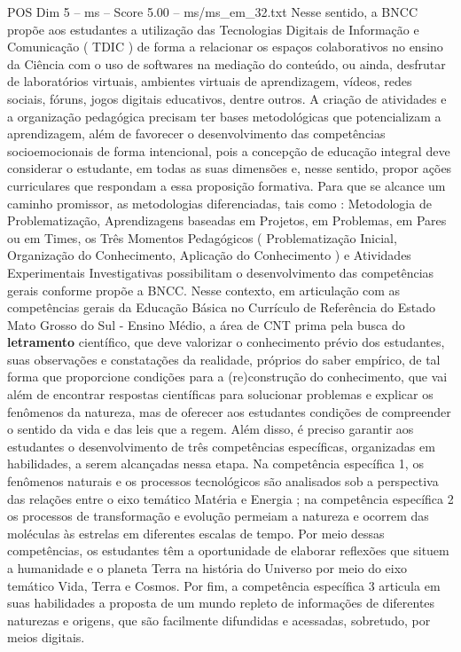 \begin{textsample}{POS Dim 5 – ms – Score 5.00 – ms/ms\_em\_32.txt}
Nesse sentido, a BNCC propõe aos estudantes a utilização das Tecnologias Digitais de Informação e Comunicação ( TDIC ) de forma a relacionar os espaços colaborativos no ensino da Ciência com o uso de softwares na mediação do conteúdo, ou ainda, desfrutar de laboratórios virtuais, ambientes virtuais de aprendizagem, vídeos, redes sociais, fóruns, jogos digitais educativos, dentre outros.
A criação de atividades e a organização pedagógica precisam ter bases metodológicas que potencializam a aprendizagem, além de favorecer o desenvolvimento das competências socioemocionais de forma intencional, pois a concepção de educação integral deve considerar o estudante, em todas as suas dimensões e, nesse sentido, propor ações curriculares que respondam a essa proposição formativa.
Para que se alcance um caminho promissor, as metodologias diferenciadas, tais como : Metodologia de Problematização, Aprendizagens baseadas em Projetos, em Problemas, em Pares ou em Times, os Três Momentos Pedagógicos ( Problematização Inicial, Organização do Conhecimento, Aplicação do Conhecimento ) e Atividades Experimentais Investigativas possibilitam o desenvolvimento das competências gerais conforme propõe a BNCC.
Nesse contexto, em articulação com as competências gerais da Educação Básica no Currículo de Referência do Estado Mato Grosso do Sul - Ensino Médio, a área de CNT prima pela busca do \textbf{letramento} científico, que deve valorizar o conhecimento prévio dos estudantes, suas observações e constatações da realidade, próprios do saber empírico, de tal forma que proporcione condições para a (re)construção do conhecimento, que vai além de encontrar respostas científicas para solucionar problemas e explicar os fenômenos da natureza, mas de oferecer aos estudantes condições de compreender o sentido da vida e das leis que a regem.
Além disso, é preciso garantir aos estudantes o desenvolvimento de três competências específicas, organizadas em habilidades, a serem alcançadas nessa etapa.
Na competência específica 1, os fenômenos naturais e os processos tecnológicos são analisados sob a perspectiva das relações entre o eixo temático Matéria e Energia ; na competência específica 2 os processos de transformação e evolução permeiam a natureza e ocorrem das moléculas às estrelas em diferentes escalas de tempo.
Por meio dessas competências, os estudantes têm a oportunidade de elaborar reflexões que situem a humanidade e o planeta Terra na história do Universo por meio do eixo temático Vida, Terra e Cosmos.
Por fim, a competência específica 3 articula em suas habilidades a proposta de um mundo repleto de informações de diferentes naturezas e origens, que são facilmente difundidas e acessadas, sobretudo, por meios digitais.

\end{textsample}
